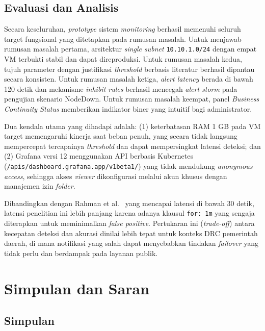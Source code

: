\documentclass[10pt,twocolumn]{article}
\begin{document}
\subsection{Evaluasi dan Analisis}

Secara keseluruhan, \textit{prototype} sistem \textit{monitoring} berhasil memenuhi seluruh target
fungsional yang ditetapkan pada rumusan masalah. Untuk menjawab rumusan masalah pertama, arsitektur
\textit{single subnet} \texttt{10.10.1.0/24} dengan empat VM terbukti stabil dan dapat direproduksi.
Untuk rumusan masalah kedua, tujuh parameter dengan justifikasi \textit{threshold} berbasis literatur
berhasil dipantau secara konsisten. Untuk rumusan masalah ketiga, \textit{alert latency} berada di
bawah 120 detik dan mekanisme \textit{inhibit rules} berhasil mencegah \textit{alert storm} pada
pengujian skenario NodeDown. Untuk rumusan masalah keempat, panel \textit{Business Continuity Status}
memberikan indikator biner yang intuitif bagi administrator.

Dua kendala utama yang dihadapi adalah: (1) keterbatasan RAM 1 GB pada VM target memengaruhi kinerja
saat beban penuh, yang secara tidak langsung mempercepat tercapainya \textit{threshold} dan dapat
mempersingkat latensi deteksi; dan (2) Grafana versi 12 menggunakan API berbasis Kubernetes
(\texttt{/apis/dashboard.grafana.app/v1beta1/}) yang tidak mendukung \textit{anonymous access},
sehingga akses \textit{viewer} dikonfigurasi melalui akun khusus dengan manajemen izin \textit{folder}.

Dibandingkan dengan Rahman et al.\ \cite{Rahman2020} yang mencapai latensi di bawah 30 detik, latensi
penelitian ini lebih panjang karena adanya klausul \texttt{for: 1m} yang sengaja diterapkan untuk
meminimalkan \textit{false positive}. Pertukaran ini (\textit{trade-off}) antara kecepatan deteksi dan
akurasi dinilai lebih tepat untuk konteks DRC pemerintah daerah, di mana notifikasi yang salah dapat
menyebabkan tindakan \textit{failover} yang tidak perlu dan berdampak pada layanan publik.

\section{Simpulan dan Saran}

\subsection{Simpulan}
\end{document}
